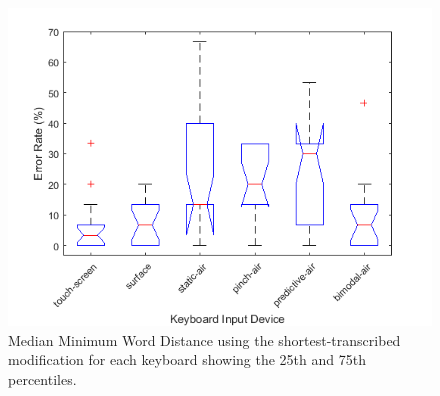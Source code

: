 \begin{figure}[t]
	\centering
	\includegraphics{Figures/fig_MWD_short_boxplot}
	\caption[Minimum Word Distance Boxplot for Modified-shortest]{Median Minimum Word Distance using the shortest-transcribed modification for each keyboard showing the 25th and 75th percentiles.}
	\label{fig_MWD_short_boxplot}
\end{figure}

